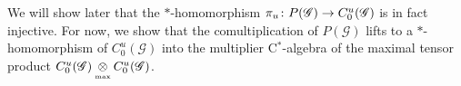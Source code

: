 
We will show later that the $*$-homomorphism $\pi_{u}
\colon P(\mathscr{G}) \to C^{u}_{0}(\mathscr{G})$ is in fact injective. For now, we show that the comultiplication of $P(\mathscr{G})$ lifts to a $*$-homomorphism  of
$C^{u}_{0}(\mathscr{G})$ into the multiplier C$^*$-algebra of the maximal tensor product
$C^{u}_{0}(\mathscr{G}) \underset{{\scriptscriptstyle \mathrm{ max}}}{\otimes}
C^{u}_{0}(\mathscr{G})$.



